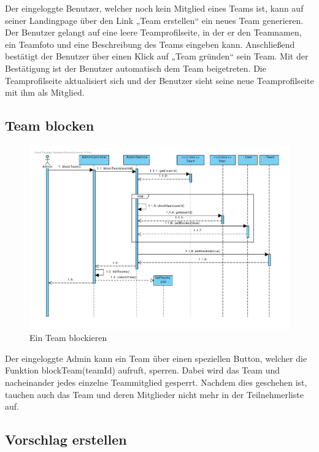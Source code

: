 Der eingeloggte Benutzer, welcher noch kein Mitglied eines Teams ist,
kann auf seiner Landingpage über den Link „Team erstellen“ ein neues
Team generieren. Der Benutzer gelangt auf eine leere Teamprofilseite,
in der er den Teamnamen, ein Teamfoto und eine Beschreibung des Teams
eingeben kann. Anschließend bestätigt der Benutzer über einen Klick
auf „Team gründen“ sein Team. Mit der Bestätigung ist der Benutzer
automatisch dem Team beigetreten. Die Teamprofilseite aktualisiert
sich und der Benutzer sieht seine neue Teamprofilseite mit ihm als
Mitglied.

\subsection{Team blocken}

\begin{figure}[H]
  \centering
  \includegraphics[width=16cm, trim= 1cm 1cm 1cm 1cm, clip, angle=90]{gfx/team_blockieren}
  \caption{Ein Team blockieren}
\end{figure}

Der eingeloggte Admin kann ein Team über einen speziellen Button, welcher die Funktion blockTeam(teamId) aufruft, sperren. Dabei wird das Team und nacheinander jedes einzelne Teammitglied gesperrt. Nachdem dies geschehen ist, tauchen auch das Team und deren Mitglieder nicht mehr in der Teilnehmerliste auf.\\

\subsection{Vorschlag erstellen}

